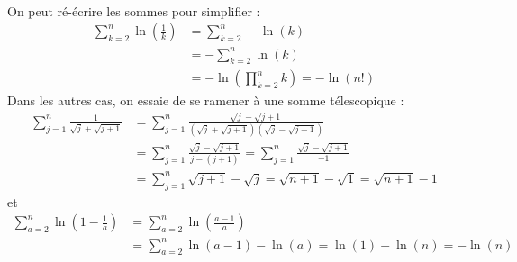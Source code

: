 {{\begin{align*}
\end{align*}
On peut ré-écrire les sommes pour simplifier :
\begin{align*}
 \sum_{k=2}^{n} \ln\left(\frac{1}{k}\right) &=  \sum_{k=2}^n -\ln(k) \\
 &= -\sum_{k=2}^n \ln(k) \\
 &= - \ln\left(\prod_{k=2}^n k \right) = -\ln(n!)
\end{align*}
Dans les autres cas, on essaie de se ramener à une somme télescopique :
\begin{align*}
 \boxed{\sum_{j=1}^n \frac{1}{\sqrt{j}+\sqrt{j+1}}} &= \sum_{j=1}^n \frac{\sqrt{j}-\sqrt{j+1}}{\left(\sqrt{j}+\sqrt{j+1}\right)\left(\sqrt{j}-\sqrt{j+1}\right)} \\
 &= \sum_{j=1}^n \frac{\sqrt{j}-\sqrt{j+1}}{j-(j+1)} = \sum_{j=1}^n \frac{\sqrt{j}-\sqrt{j+1}}{-1} \\
 &= \sum_{j=1}^n \sqrt{j+1}-\sqrt{j} = \sqrt{n+1}-\sqrt{1}=\boxed{\sqrt{n+1}-1}
\end{align*}
et
\begin{align*}
 \boxed{\sum_{a=2}^n \ln \left(1-\frac{1}{a}\right)} &= \sum_{a=2}^n \ln \left( \frac{a-1}{a}\right) \\
 &= \sum_{a=2}^n \ln(a-1) - \ln(a) = \ln(1)-\ln(n)=\boxed{-\ln(n)}
\end{align*}}
}

